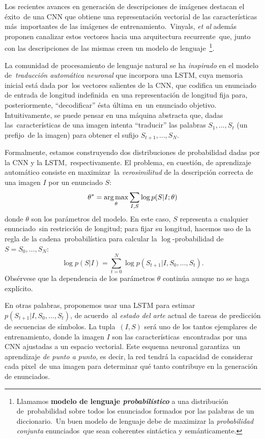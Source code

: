 \noindent
Los recientes avances en generación de descripciones de imágenes destacan el éxito\
de una CNN que obtiene una representación vectorial de las características más\
importantes de las imágenes de entrenamiento\cite{DBLP:journals/corr/VinyalsTBE14}.\
Vinyals, \emph{et al} además proponen canalizar estos vectores hacia una arquitectura recurrente\
que, junto con las descripciones de las mismas creen un modelo de lenguaje\
\footnote{
  Llamamos \textbf{modelo de lenguaje \textit{probabilístico}} a una distribución de\
  probabilidad sobre todos los enunciados formados por las palabras de un diccionario.\
  Un buen modelo de lenguaje debe de maximizar la \emph{probabilidad conjunta} enunciados\
  que sean coherentes sintáctica y semánticamente.
}.\par
La comunidad de procesamiento de lenguaje natural se ha \emph{inspirado} en el modelo de\
\emph{traducción automática neuronal} que incorpora una LSTM, cuya memoria inicial está dada por\
los vectores salientes de la CNN, que codifica un enunciado de entrada de longitud indefinida\
en una representación de longitud fija para, posteriormente, ``decodificar'' ésta última en\
un enunciado objetivo. Intuitivamente, se puede pensar en una máquina abstracta que, dadas las\
características de una imagen intenta ``traducir'' las palabras $S_1,\ldots,S_t$ (un prefijo\
de la imagen) para obtener el sufijo $S_{t+1},\ldots,S_{N}$.\par
Formalmente, estamos construyendo dos distribuciones de probabilidad dadas por la CNN y la LSTM,\
respectivamente. El problema, en cuestión, de aprendizaje automático consiste en maximizar\
la \emph{verosimilitud} de la descripción correcta de una imagen $I$ por un enunciado $S$:
\begin{equation}
  \theta^* = \operatorname*{arg\,max}_\theta \sum_{I, S} \log p(S|I;\theta)
\end{equation}
donde $\theta$ son los parámetros del modelo. En este caso, $S$ representa a cualquier enunciado\
sin restricción de longitud; para fijar su longitud, hacemos uso de la regla de la cadena\
probabilística para calcular la $\log$-probabilidad de $S = S_0,\ldots,S_N$:
\begin{equation}
  \log p(S|I) = \sum_{t=0}^N \log p(S_{t+1}|I,S_0,\ldots,S_t).
\end{equation}
Obsérvese que la dependencia de los parámetros $\theta$ continúa aunque no se haga explícito.\par
En otras palabras, proponemos usar una LSTM para estimar $p(S_{t+1}|I,S_0,\ldots,S_t)$, de acuerdo\
al \emph{estado del arte} actual de tareas de predicción de secuencias de símbolos. La tupla\
$(I,S)$ será uno de los tantos ejemplares de entrenamiento, donde la imagen $I$ son las características\
encontradas por una CNN ajustadas a un espacio vectorial. Este esquema neuronal garantiza\
un aprendizaje \emph{de punto a punto}, es decir, la red tendrá la capacidad de considerar cada pixel\
de una imagen para determinar qué tanto contribuye en la generación de enunciados.

